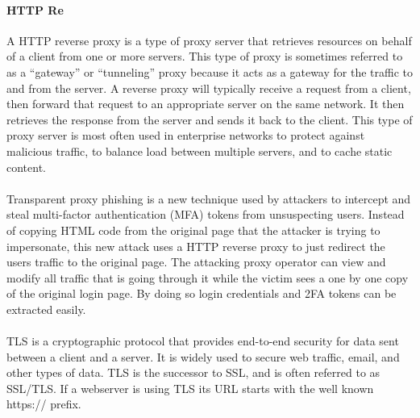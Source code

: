 \documentclass[12pt]{scrbook}
\begin{document}
\paragraph{HTTP Re}
A HTTP reverse proxy is a type of proxy server that
retrieves resources on behalf of a client from one or more servers. This type of
proxy is sometimes referred to as a “gateway” or “tunneling” proxy because it
acts as a gateway for the traffic to and from the server. A reverse proxy will
typically receive a request from a client, then forward that request to an
appropriate server on the same network. It then retrieves the response from the
server and sends it back to the client. This type of proxy server is most often
used in enterprise networks to protect against malicious traffic, to balance
load between multiple servers, and to cache static content.

\paragraph{}
Transparent proxy phishing is a new technique used by attackers to intercept and steal
multi-factor authentication (MFA) tokens from unsuspecting users. Instead of
copying HTML code from the original page that the attacker is trying to
impersonate, this new attack uses a HTTP reverse proxy to just redirect the
users traffic to the original page. The attacking proxy operator can view and
modify all traffic that is going through it while the victim sees a one by one
copy of the original login page. By doing so login credentials and 2FA tokens
can be extracted easily.

\paragraph{}
TLS is a cryptographic protocol that provides
end-to-end security for data sent between a client and a server. It is widely
used to secure web traffic, email, and other types of data. TLS is the successor
to SSL, and is often referred to as SSL/TLS. If a webserver is using TLS its URL
starts with the well known https:// prefix.
\end{document}
